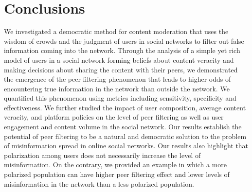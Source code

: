 





\section{Conclusions}\label{sec:Conclusions}
We investigated a democratic method for content moderation that uses the wisdom of crowds and the judgment of users in social networks to filter out false information coming into the network. Through the analysis of a simple yet rich model of users in a social network forming beliefs about content veracity and making decisions about sharing the content with their peers, we demonstrated the emergence of the peer filtering phenomenon that leads to higher odds of encountering true information in the network than outside the network. We quantified this phenomenon using metrics including sensitivity, specificity and effectiveness. We further studied the impact of user composition, average content veracity, and platform policies on the level of peer filtering as well as user engagement and content volume in the social network. Our results establish the potential of peer filtering to be a natural and democratic solution to the problem of misinformation spread in online social networks. Our results also highlight that polarization among users does not necessarily increase the level of misinformation. On the contrary, we provided an example in which a more polarized population can have higher peer filtering effect and lower levels of misinformation in the network than a less polarized population.

